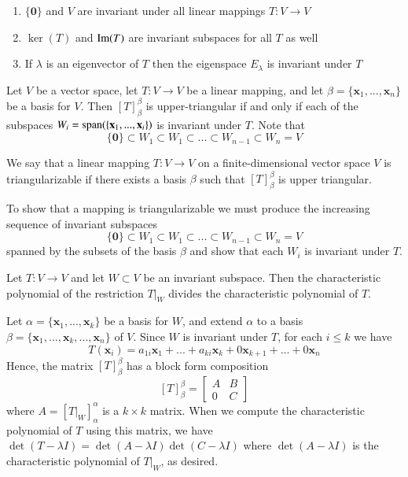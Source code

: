 \documentclass[12pt]{report}
\newcommand{\mb}[1]{\mathbf{#1}}
\begin{document}
\begin{eg*}{}{}
    \begin{enumerate}[label = \alph*]
        \item $\{\mb 0\}$ and $V$ are invariant under all linear mappings $T:V\rightarrow V$
        \item $\ker(T)$ and $\operatorname{Im}(T)$ are invariant subspaces for all $T$ as well
        \item If $\lambda$ is an eigenvector of $T$ then the eigenspace $E_{\lambda}$ is invariant under $T$
    \end{enumerate}
\end{eg*}

\begin{prop}{}{}
    Let $V$ be a vector space, let $T:V\rightarrow V$ be a linear mapping, and let $\beta = \{\mb x_1,...,\mb x_n\}$ be a basis for $V$. Then $[T]_{\beta}^{\beta}$ is upper-triangular if and only if each of the subspaces $W_i = \spn(\{\mb x_1,..., \mb x_i\})$ is invariant under $T$. Note that $$\{\mb 0\} \subset W_1 \subset W_1 \subset ... \subset W_{n-1} \subset W_n = V$$
\end{prop}

\begin{defn}{}{}
    We say that a linear mapping $T:V \rightarrow V$ on a finite-dimensional vector space $V$ is triangularizable if there exists a basis $\beta$ such that $[T]_{\beta}^{\beta}$ is upper triangular.
\end{defn}


\begin{rmk}{}{}
    To show that a mapping is triangularizable we must produce the increasing sequence of invariant subspaces $$\{\mb 0\} \subset W_1 \subset W_1 \subset ... \subset W_{n-1} \subset W_n = V$$
    spanned by the subsets of the basis $\beta$ and show that each $W_i$ is invariant under $T$.
\end{rmk}


\begin{prop}{}{}
    Let $T:V\rightarrow V$ and let $W \subset V$ be an invariant subspace. Then the characteristic polynomial of the restriction $T\rvert_W$ divides the characteristic polynomial of $T$.
\end{prop}

\begin{proof*}{}{}
    Let $\alpha = \{\mb x_1,...,\mb x_k\}$ be a basis for $W$, and extend $\alpha$ to a basis $\beta = \{\mb x_1,...,\mb x_k,...,\mb x_n\}$ of $V$. Since $W$ is invariant under $T$, for each $i \leq k$ we have $$T(\mb x_i) = a_{1i}\mb x_1 + ... + a_{ki}\mb x_k + 0\mb x_{k+1} + ... + 0 \mb x_n$$
    Hence, the matrix $[T]_{\beta}^{\beta}$ has a block form composition $$[T]_{\beta}^{\beta} = \begin{bmatrix} A & B \\ 0 & C \end{bmatrix}$$
    where $A = [T\rvert_W]_{\alpha}^{\alpha}$ is a $k \times k$ matrix. When we compute the characteristic polynomial of $T$ using this matrix, we have $\det(T - \lambda I) = \det(A - \lambda I)\det(C - \lambda I)$ where $\det(A - \lambda I)$ is the characteristic polynomial of $T\rvert_W$, as desired.
\end{proof*}
\end{document}
